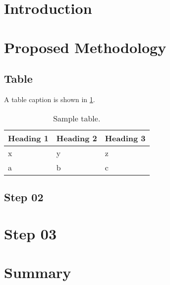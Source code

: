 \section{Introduction}
\lipsum[9-10]

\section{Proposed Methodology}
\lipsum[1-1]



\subsection{Table}
A table caption is shown in \ref{tab:sample-table}.
\begin{table}[H]
\centering
\caption{Sample table.}
\label{tab:sample-table}
\begin{tabular}{lll}
\toprule
\multicolumn{1}{c}{\textbf{Heading 1}} & \multicolumn{1}{c}{\textbf{Heading 2}} & \multicolumn{1}{c}{\textbf{Heading 3}} \\ \midrule
x                                      & y                                      & z                                      \\
a                                      & b                                      & c \\       \bottomrule                             
\end{tabular}
\end{table}

\subsection{Step 02}

\lipsum[1-5]

\section{Step 03}
\lipsum[1-8]

\section{Summary}
\lipsum[2-3]